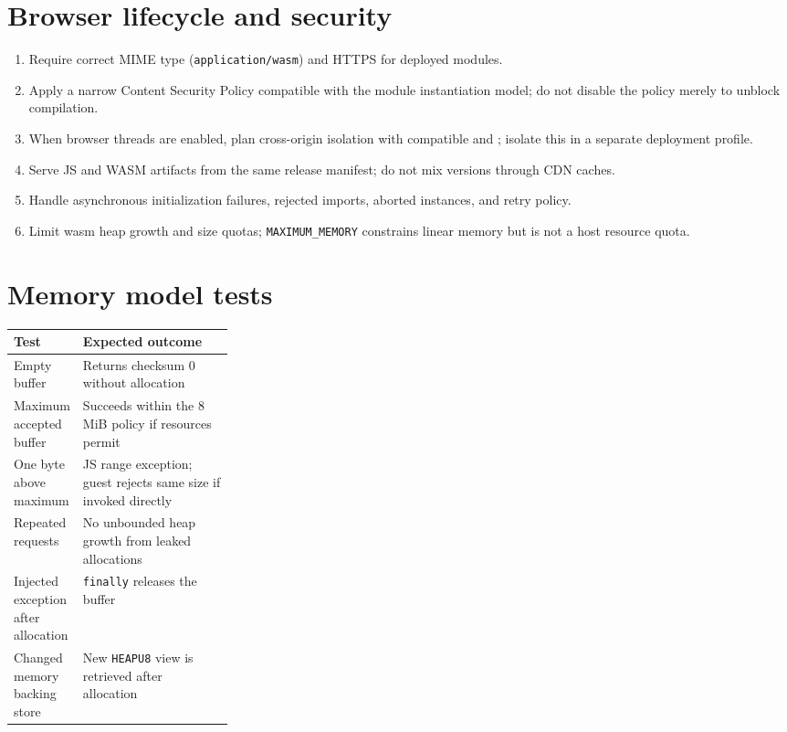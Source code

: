 \documentclass[11pt,letterpaper]{article}
\begin{document}
\section{Browser lifecycle and security}
\begin{enumerate}
\item Require correct MIME type (\texttt{application/wasm}) and HTTPS for deployed modules.
\item Apply a narrow Content Security Policy compatible with the module instantiation model; do not disable the policy merely to unblock compilation.
\item When browser threads are enabled, plan cross-origin isolation with compatible  and ; isolate this in a separate deployment profile.
\item Serve JS and WASM artifacts from the same release manifest; do not mix versions through CDN caches.
\item Handle asynchronous initialization failures, rejected imports, aborted instances, and retry policy.
\item Limit wasm heap growth and size quotas; \texttt{MAXIMUM\_MEMORY} constrains linear memory but is not a host resource quota.
\end{enumerate}

\section{Memory model tests}
\noindent\begin{tabularx}{\linewidth}{>{\raggedright\arraybackslash}p{0.28\linewidth}>{\raggedright\arraybackslash}X}
\toprule Test & Expected outcome \\ \midrule
Empty buffer & Returns checksum 0 without allocation \\
Maximum accepted buffer & Succeeds within the 8 MiB policy if resources permit \\
One byte above maximum & JS range exception; guest rejects same size if invoked directly \\
Repeated requests & No unbounded heap growth from leaked allocations \\
Injected exception after allocation & \texttt{finally} releases the buffer \\
Changed memory backing store & New \texttt{HEAPU8} view is retrieved after allocation \\
\bottomrule
\end{tabularx}
\end{document}
